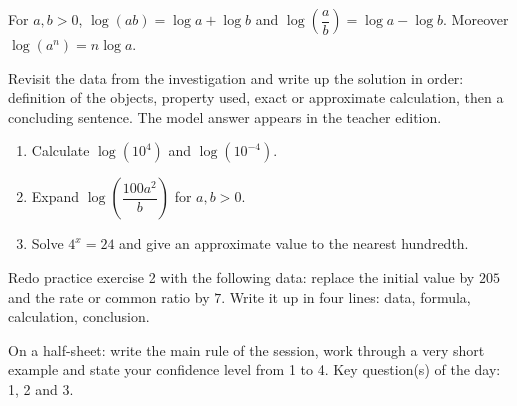 \begin{traceecrite}For $a,b>0$, $\log(ab)=\log a+\log b$ and $\log\!\left(\dfrac ab\right)=\log a-\log b$. Moreover $\log(a^n)=n\log a$.\end{traceecrite}

\begin{exemple}
Revisit the data from the investigation and write up the solution in order: definition of the objects, property used, exact or approximate calculation, then a concluding sentence. The model answer appears in the teacher edition.
\end{exemple}

\begin{exercice}[-- essential]
\begin{enumerate}\item Calculate $\log(10^4)$ and $\log(10^{-4})$.\item Expand $\log\!\left(\dfrac{100a^2}{b}\right)$ for $a,b>0$.\item Solve $4^x=24$ and give an approximate value to the nearest hundredth.\end{enumerate}
\end{exercice}


\begin{dm}Redo practice exercise 2 with the following data: replace the initial value by $205$ and the rate or common ratio by $7$. Write it up in four lines: data, formula, calculation, conclusion.\end{dm}

\begin{sortie}On a half-sheet: write the main rule of the session, work through a very short example and state your confidence level from 1 to 4. Key question(s) of the day: 1, 2 and 3.\end{sortie}

